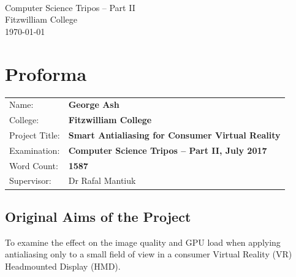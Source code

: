 \documentclass[12pt,a4paper,twoside,openright]{report}
\begin{document}





\pagestyle{empty}


\vspace*{60mm}
\begin{center}
\Huge
\textbf{} \\[5mm]
Computer Science Tripos -- Part II \\[5mm]
Fitzwilliam College \\[5mm]
\today  %
\end{center}


\pagestyle{plain}

\chapter*{Proforma}

{\large
\begin{tabular}{ll}
Name:               & \bf George Ash                       \\
College:            & \bf Fitzwilliam College                     \\
Project Title:      & \bf Smart Antialiasing for Consumer Virtual Reality \\
Examination:        & \bf Computer Science Tripos -- Part II, July 2017  \\
Word Count:         & \bf 1587\footnotemark[1] \\
Supervisor:         & Dr Rafal Mantiuk                    \\ 
\end{tabular}
}


\section*{Original Aims of the Project}

To examine the effect on the image quality and GPU load when applying antialiasing only to a small field of view in a consumer Virtual Reality (VR) Headmounted Display (HMD).
\end{document}
